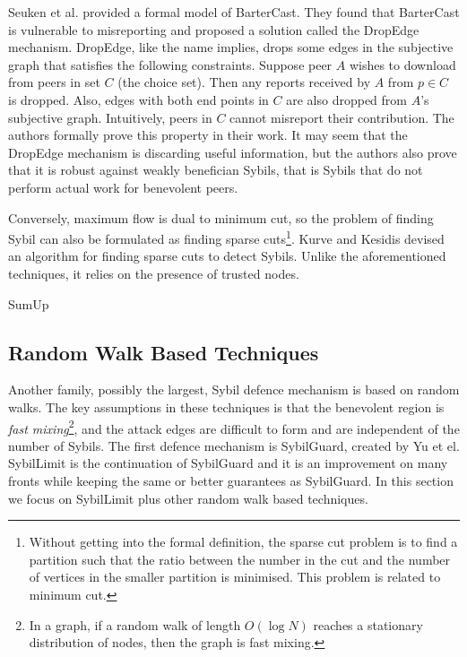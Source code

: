 Seuken et al. provided a formal model of BarterCast. They found that BarterCast
is vulnerable to misreporting and proposed a solution called the DropEdge
mechanism\cite{seuken2011sybil, seuken2014sybil}. DropEdge, like the name
implies, drops some edges in the subjective graph that satisfies the following
constraints. Suppose peer $A$ wishes to download from peers in set $C$ (the
choice set). Then any reports received by $A$ from $p \in C$ is dropped. Also,
edges with both end points in $C$ are also dropped from $A$'s subjective graph.
Intuitively, peers in $C$ cannot misreport their contribution. The authors
formally prove this property in their work. It may seem that the DropEdge
mechanism is discarding useful information, but the authors also prove that it
is robust against weakly benefician Sybils, that is Sybils that do not perform
actual work for benevolent peers.

Conversely, maximum flow is dual to minimum cut, so the problem of finding Sybil
can also be formulated as finding sparse cuts\footnote{Without getting into the
  formal definition, the sparse cut problem is to find a partition such that the
  ratio between the number in the cut and the number of vertices in the smaller
  partition is minimised. This problem is related to minimum cut.}. Kurve and
Kesidis devised an algorithm for finding sparse cuts to detect
Sybils\cite{kurve2011sybil}. Unlike the aforementioned techniques, it relies on
the presence of trusted nodes.

SumUp\cite{tran2009sybil}

\subsection{Random Walk Based Techniques}
Another family, possibly the largest, Sybil defence mechanism is based on random
walks. The key assumptions in these techniques is that the benevolent region is
\emph{fast mixing}\footnote{In a graph, if a random walk of length $O(\log{N})$
  reaches a stationary distribution of nodes, then the graph is fast mixing.},
and the attack edges are difficult to form and are independent of the number of
Sybils. The first defence mechanism is SybilGuard\cite{yu2006sybilguard},
created by Yu et el. SybilLimit\cite{yu2008sybillimit} is the continuation of
SybilGuard and it is an improvement on many fronts while keeping the same or
better guarantees as SybilGuard. In this section we focus on SybilLimit plus
other random walk based techniques.

